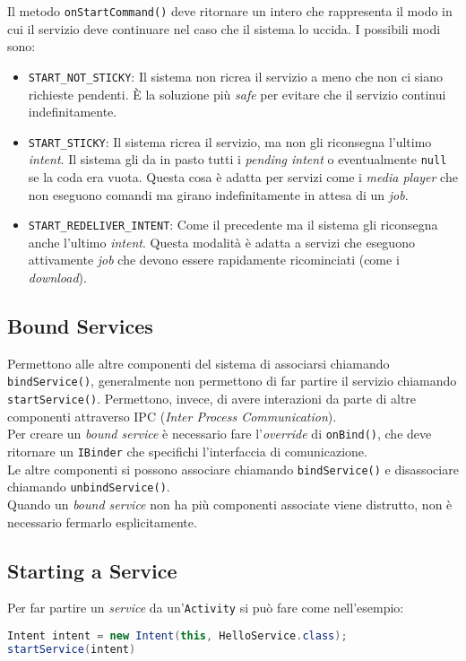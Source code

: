 Il metodo \texttt{onStartCommand()} deve ritornare un intero che rappresenta il modo in cui il servizio deve continuare nel caso che il sistema lo uccida. I possibili modi sono:

\begin{itemize}
	\item \texttt{START\_NOT\_STICKY}: Il sistema non ricrea il servizio a meno che non ci siano richieste pendenti. È la soluzione più \textit{safe} per evitare che il servizio continui indefinitamente.
	\item \texttt{START\_STICKY}: Il sistema ricrea il servizio, ma non gli riconsegna l'ultimo \textit{intent}. Il sistema gli da in pasto tutti i \textit{pending intent} o eventualmente \texttt{null} se la coda era vuota.
	Questa cosa è adatta per servizi come i \textit{media player} che non eseguono comandi ma girano indefinitamente in attesa di un \textit{job}.
	\item \texttt{START\_REDELIVER\_INTENT}: Come il precedente ma il sistema gli riconsegna anche l'ultimo \textit{intent}. Questa modalità è adatta a servizi che eseguono attivamente \textit{job} che devono essere rapidamente ricominciati (come i \textit{download}).
\end{itemize}

\subsection{Bound Services}
Permettono alle altre componenti del sistema di associarsi chiamando \texttt{bindService()}, generalmente non permettono di far partire il servizio chiamando \texttt{startService()}. Permettono, invece, di avere interazioni da parte di altre componenti attraverso IPC (\textit{Inter Process Communication}).\\
Per creare un \textit{bound service} è necessario fare l'\textit{override} di \texttt{onBind()}, che deve ritornare un \texttt{IBinder} che specifichi l'interfaccia di comunicazione.\\
Le altre componenti si possono associare chiamando \texttt{bindService()} e disassociare chiamando \texttt{unbindService()}.\\
Quando un \textit{bound service} non ha più componenti associate viene distrutto, non è necessario fermarlo esplicitamente.


\subsection{Starting a Service}
Per far partire un \textit{service} da un'\texttt{Activity} si può fare come nell'esempio:
\begin{lstlisting}[language=Java]
Intent intent = new Intent(this, HelloService.class);
startService(intent)
\end{lstlisting}

